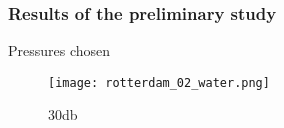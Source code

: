 









\subsubsection{Results of the preliminary study}

Pressures chosen 






\begin{figure}[h]
     \centering
          \texttt{[image: rotterdam\_02\_water.png]}
     \caption{30db}
   \label{fig:water_cavitation_70}
\end{figure}


